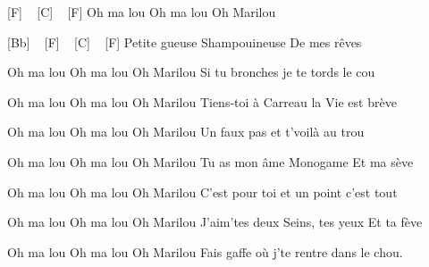 

[F] ~ [C] ~ [F] 
Oh ma lou Oh ma lou Oh Marilou

[Bb] ~ [F] ~ [C] ~ [F] 
Petite gueuse Shampouineuse De mes rêves

Oh ma lou Oh ma lou Oh Marilou
Si tu bronches je te tords le cou

Oh ma lou Oh ma lou Oh Marilou
Tiens-toi à Carreau la Vie est brève


Oh ma lou Oh ma lou Oh Marilou
Un faux pas et t'voilà au trou

Oh ma lou Oh ma lou Oh Marilou
Tu as mon âme Monogame Et ma sève

Oh ma lou Oh ma lou Oh Marilou
C'est pour toi et un point c'est tout

Oh ma lou Oh ma lou Oh Marilou
J'aim'tes deux Seins, tes yeux Et ta fève

Oh ma lou Oh ma lou Oh Marilou
Fais gaffe où j'te rentre dans le chou. 
